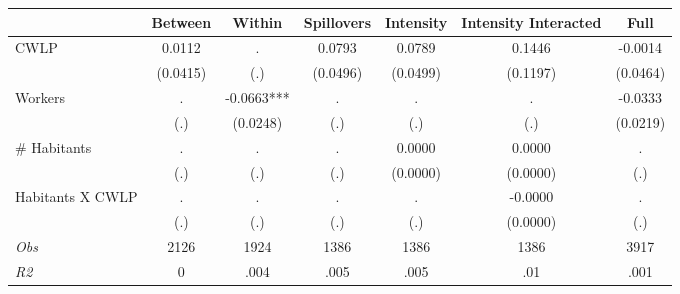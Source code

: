 \begin{tabular}{l*{6}{c}}\hline&\multicolumn{1}{c}{Between}&\multicolumn{1}{c}{Within}&\multicolumn{1}{c}{Spillovers}&\multicolumn{1}{c}{Intensity}&\multicolumn{1}{c}{Intensity Interacted}&\multicolumn{1}{c}{Full}\\ \hline 
CWLP & 0.0112 & . & 0.0793 & 0.0789 & 0.1446 & -0.0014 \\
 & (0.0415) & (.) & (0.0496) & (0.0499) & (0.1197) & (0.0464) \\
Workers & . & -0.0663*** & . & . & . & -0.0333 \\
 & (.) & (0.0248) & (.) & (.) & (.) & (0.0219) \\
\# Habitants & . & . & . & 0.0000 & 0.0000 & . \\
 & (.) & (.) & (.) & (0.0000) & (0.0000) & (.) \\
Habitants X CWLP & . & . & . & . & -0.0000 & . \\
 & (.) & (.) & (.) & (.) & (0.0000) & (.) \\
\hline \textit{Obs} & 2126 & 1924 & 1386 & 1386 & 1386 & 3917 \\ \textit{R2} & 0 & .004 & .005 & .005 & .01 & .001 \\ \hline \end{tabular}
